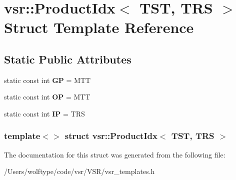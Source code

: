 \hypertarget{structvsr_1_1_product_idx_3_01_t_s_t_00_01_t_r_s_01_4}{\section{vsr\-:\-:Product\-Idx$<$ T\-S\-T, T\-R\-S $>$ Struct Template Reference}
\label{structvsr_1_1_product_idx_3_01_t_s_t_00_01_t_r_s_01_4}
}
\subsection*{Static Public Attributes}
\begin{DoxyCompactItemize}
\item 
\hypertarget{structvsr_1_1_product_idx_3_01_t_s_t_00_01_t_r_s_01_4_a008d602c2b43ca6691dc06f3097f8b9f}{static const int {\bfseries G\-P} = M\-T\-T}\label{structvsr_1_1_product_idx_3_01_t_s_t_00_01_t_r_s_01_4_a008d602c2b43ca6691dc06f3097f8b9f}

\item 
\hypertarget{structvsr_1_1_product_idx_3_01_t_s_t_00_01_t_r_s_01_4_af47aac7586ec7c99c675e91688da0258}{static const int {\bfseries O\-P} = M\-T\-T}\label{structvsr_1_1_product_idx_3_01_t_s_t_00_01_t_r_s_01_4_af47aac7586ec7c99c675e91688da0258}

\item 
\hypertarget{structvsr_1_1_product_idx_3_01_t_s_t_00_01_t_r_s_01_4_a4427f27d96e8b2486e63a759373dabb5}{static const int {\bfseries I\-P} = T\-R\-S}\label{structvsr_1_1_product_idx_3_01_t_s_t_00_01_t_r_s_01_4_a4427f27d96e8b2486e63a759373dabb5}

\end{DoxyCompactItemize}
\subsubsection*{template$<$$>$ struct vsr\-::\-Product\-Idx$<$ T\-S\-T, T\-R\-S $>$}



The documentation for this struct was generated from the following file\-:\begin{DoxyCompactItemize}
\item 
/\-Users/wolftype/code/vsr/\-V\-S\-R/vsr\-\_\-templates.\-h\end{DoxyCompactItemize}
